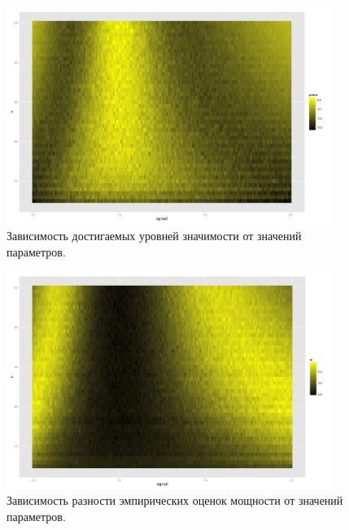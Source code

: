 \documentclass[10pt]{article}
\begin{document}
\begin{figure}[h]
  \centering
  \includegraphics[width=300pt]{diff_pvalue.png}
  \caption{Зависимость достигаемых уровней значимости от значений параметров.}
\end{figure}

\begin{figure}[h]
  \centering
  \includegraphics[width=300pt]{diff_fo.png}
  \caption{Зависимость разности эмпирических оценок мощности от значений параметров.}
\end{figure}
\end{document}
